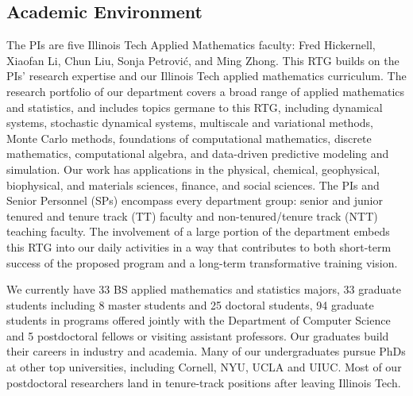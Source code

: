 \documentclass[11pt]{NSFamsart}
\newcommand{\numUG}{33\xspace}
\newcommand{\numMS}{8\xspace}
\newcommand{\numPHD}{25\xspace}
\newcommand{\numGrad}{33\xspace}
\newcommand{\numPostDoc}{5\xspace}
\newcommand{\numjoint}{94\xspace}
\begin{document}
\subsection*{Academic Environment} The PIs are five Illinois Tech Applied Mathematics faculty:  %
Fred Hickernell, Xiaofan Li, Chun Liu, Sonja Petrovi\'c, and Ming Zhong. This RTG builds on the PIs' research expertise and our Illinois Tech applied mathematics curriculum.   The research portfolio of our department covers a broad range of applied mathematics and statistics, and includes topics germane to this RTG, including dynamical systems, stochastic dynamical systems, multiscale and variational methods,  Monte Carlo methods, foundations of computational mathematics, discrete mathematics, computational algebra, and data-driven predictive modeling and simulation. Our work has applications in the physical, chemical, geophysical, biophysical, and materials sciences, finance, and social sciences. 
The PIs and Senior Personnel (SPs) encompass every department group: senior and junior tenured and tenure track (TT) faculty and non-tenured/tenure track (NTT) teaching faculty. The involvement of a large portion of the department embeds this RTG into our daily activities in a way that contributes to both short-term success of the proposed program and a long-term transformative training vision. 

We currently have \numUG BS applied mathematics and statistics majors, \numGrad graduate students including \numMS master students and \numPHD doctoral students, \numjoint graduate students in programs offered jointly with the Department of Computer Science and \numPostDoc postdoctoral fellows or visiting assistant professors. Our graduates build their careers in  industry  and academia. Many of our undergraduates pursue PhDs at other top universities, including Cornell, NYU, UCLA and UIUC. Most of our postdoctoral researchers land in tenure-track positions after leaving Illinois Tech.
\end{document}
